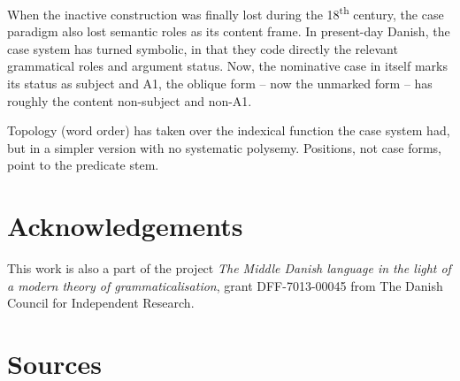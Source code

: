 \documentclass[output=paper]{langscibook}
\begin{document}
When the inactive construction was finally lost during the 18\textsuperscript{th} century, the case paradigm also lost semantic roles as its content frame. In present-day Danish, the case system has turned symbolic, in that they code directly the relevant grammatical roles and argument status. Now, the nominative case in itself marks its status as subject and A1, the oblique form – now the unmarked form – has roughly the content non-subject and non-A1. 

Topology (word order) has taken over the indexical function the case system had, but in a simpler version with no systematic polysemy. Positions, not case forms, point to the predicate stem. 


\section*{Acknowledgements}

This work is also a part of the project \textit{The Middle Danish language in the light of a modern theory of grammaticalisation}, grant DFF-7013-00045 from The Danish Council for Independent Research.

\section*{Sources} \label{heltoft:sources}
\end{document}
